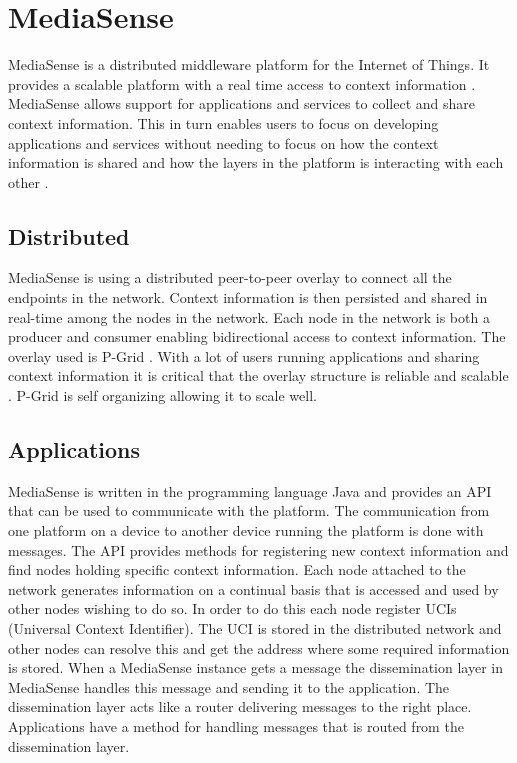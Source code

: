 \section{MediaSense}
MediaSense is a distributed middleware platform for the Internet of Things. It provides a scalable platform with a real time access to context information \cite{Kanter539187}. MediaSense allows support for applications and services to collect and share context information. This in turn enables users to focus on developing applications and services without needing to focus on how the context information is shared and how the layers in the platform is interacting with each other \cite{Walters413794}. 

\subsection{Distributed}
MediaSense is using a distributed peer-to-peer overlay to connect all the endpoints in the network. Context information is then persisted and shared in real-time among the nodes in the network. Each node in the network is both a producer and consumer enabling bidirectional access to context information. The overlay used is P-Grid \cite{aberer2003p}. With a lot of users running applications and sharing context information it is critical that the overlay structure is reliable and scalable \cite{aberer2003p}. P-Grid is self organizing allowing it to scale well. 

\subsection{Applications}
MediaSense is written in the programming language Java and provides an API that can be used to communicate with the platform. The communication from one platform on a device to another device running the platform is done with messages. The API provides methods for registering new context information and find nodes holding specific context information. Each node attached to the network generates information on a continual basis that is accessed and used by other nodes wishing to do so. In order to do this each node register UCIs (Universal Context Identifier). The UCI is stored in the distributed network and other nodes can resolve this and get the address where some required information is stored. When a MediaSense instance gets a message the dissemination layer in MediaSense handles this message and sending it to the application. The dissemination layer acts like a router delivering messages to the right place. Applications have a method for handling messages that is routed from the dissemination layer. 

